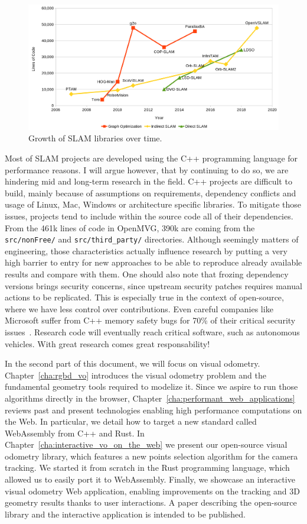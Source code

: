 \begin{figure}[h]
	\centering
	\includegraphics[width=\linewidth]{assets/img/slam-cloc.png}
	\caption{Growth of SLAM libraries over time.}%
	\label{fig:assets/img/slam-cloc}
\end{figure}

Most of SLAM projects are developed using the C++ programming language for performance reasons.
I will argue however, that by continuing to do so, we are hindering mid and long-term research
in the field.
C++ projects are difficult to build, mainly because of assumptions on requirements,
dependency conflicts and usage of Linux, Mac, Windows or architecture specific libraries.
To mitigate those issues, projects tend to include within the source code all of their dependencies.
From the 461k lines of code in OpenMVG, 390k are coming from the \verb|src/nonFree/|
and \verb|src/third_party/| directories.
Although seemingly matters of engineering, those characteristics actually influence research
by putting a very high barrier to entry for new approaches to be able
to reproduce already available results and compare with them.
One should also note that frozing dependency versions brings security concerns,
since upstream security patches requires manual actions to be replicated.
This is especially true in the context of open-source,
where we have less control over contributions.
Even careful companies like Microsoft suffer from C++ memory safety bugs
for 70\% of their critical security issues~\cite{msrc-safer}.
Research code will eventually reach critical software, such as autonomous vehicles.
With great research comes great responsability!

In the second part of this document, we will focus on visual odometry.
Chapter~\ref{cha:rgbd_vo} introduces the visual odometry problem
and the fundamental geometry tools required to modelize it.
Since we aspire to run those algorithms directly in the browser,
Chapter~\ref{cha:performant_web_applications} reviews past and present technologies
enabling high performance computations on the Web.
In particular, we detail how to target a new standard called WebAssembly from C++ and Rust.
In Chapter~\ref{cha:interactive_vo_on_the_web} we present our open-source visual odometry library,
which features a new points selection algorithm for the camera tracking.
We started it from scratch in the Rust programming language,
which allowed us to easily port it to WebAssembly.
Finally, we showcase an interactive visual odometry Web application,
enabling improvements on the tracking and 3D geometry results thanks to user interactions.
A paper describing the open-source library and the interactive application is intended to be published.

